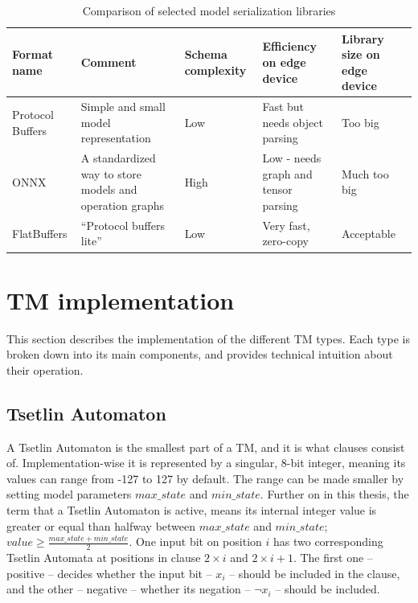 \begin{table}[!htbp]
\centering
\caption[Comparison of model serialization libraries]{Comparison of selected model serialization libraries\label{tab:serial-lib-comp}}
\begin{tabularx}{\textwidth}{@{}L L L L L@{}} \toprule
    \textbf{Format name} & \textbf{Comment} & \textbf{Schema complexity} & \textbf{Efficiency on edge device} & \textbf{Library size on edge device} \\ \midrule \midrule
    Protocol Buffers & Simple and small model representation & Low & Fast but needs object parsing & Too big \\ \midrule
    ONNX & A standardized way to store models and operation graphs & High & Low - needs graph and tensor parsing & Much too big \\ \midrule
    FlatBuffers & ``Protocol buffers lite'' & Low & Very fast, zero-copy & Acceptable \\ \bottomrule
\end{tabularx}
\end{table}

\section{TM implementation}
This section describes the implementation of the different TM types. Each type is broken down into its main components, and provides technical intuition about their operation.

\subsection{Tsetlin Automaton}
A Tsetlin Automaton is the smallest part of a TM, and it is what clauses consist of. Implementation-wise it is represented by a singular, 8-bit integer, meaning its values can range from -127 to 127 by default. The range can be made smaller by setting model parameters $max\_state$ and $min\_state$. 
Further on in this thesis, the term that a Tsetlin Automaton is active, means its internal integer value is greater or equal than halfway between $max\_state$ and $min\_state$; $value \ge \frac{max\_state + min\_state}{2}$. 
One input bit on position $i$ has two corresponding Tsetlin Automata at positions in clause $2 \times i$ and $2 \times i + 1$. The first one -- positive -- decides whether the input bit -- $x_i$ -- should be included in the clause, and the other -- negative -- whether its negation -- $\neg x_i$ -- should be included.

